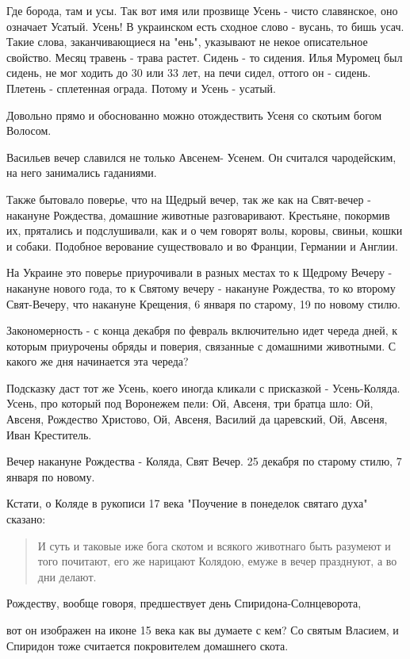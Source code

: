 \documentclass[a5paper,11pt,openany]{article}
\begin{document}
   Где борода, там и усы. Так вот имя или прозвище Усень - чисто славянское, оно означает Усатый. Усень! В украинском есть сходное слово - вусань, то бишь усач. Такие слова, заканчивающиеся на "ень", указывают не некое описательное свойство. Месяц травень - трава растет. Сидень - то сидения. Илья Муромец был сидень, не мог ходить до 30 или 33 лет, на печи сидел, оттого он - сидень. Плетень - сплетенная ограда. Потому и Усень - усатый.

   Довольно прямо и обоснованно можно отождествить Усеня со скотьим богом Волосом.

   Васильев вечер славился не только Авсенем- Усенем. Он считался чародейским, на него занимались гаданиями.

   Также бытовало поверье, что на Щедрый вечер, так же как на Свят-вечер - накануне Рождества, домашние животные разговаривают. Крестьяне, покормив их, прятались и подслушивали, как и о чем говорят волы, коровы, свиньи, кошки и собаки. Подобное верование существовало и во Франции, Германии и Англии. 

   На Украине это поверье приурочивали в разных местах то к Щедрому Вечеру - накануне нового года, то к Святому вечеру - накануне Рождества, то ко второму Свят-Вечеру, что накануне Крещения, 6 января по старому, 19 по новому стилю.

   Закономерность - с конца декабря по февраль включительно идет череда дней, к которым приурочены обряды и поверия, связанные с домашними животными. С какого же дня начинается эта череда?

   Подсказку даст тот же Усень, коего иногда кликали с присказкой - Усень-Коляда. Усень, про который под Воронежем пели: 
Ой, Авсеня, три братца шло: Ой, Авсеня, Рождество Христово, Ой, Авсеня, Василий да царевский, Ой, Авсеня, Иван Креститель.

    Вечер накануне Рождества - Коляда, Свят Вечер. 25 декабря по старому стилю, 7 января по новому. 

   Кстати, о Коляде в рукописи 17 века "Поучение в понеделок святаго духа" сказано:

\begin{quotation}
\noindent И суть и таковые иже бога скотом и всякого животнаго быть разумеют и того почитают, его же нарицают Колядою, емуже в вечер празднуют, а во дни делают.\end{quotation}

   Рождеству, вообще говоря, предшествует день Спиридона-Солнцеворота, 

вот он изображен на иконе 15 века как вы думаете с кем? Со святым Власием, и Спиридон тоже считается покровителем домашнего скота.
\end{document}
